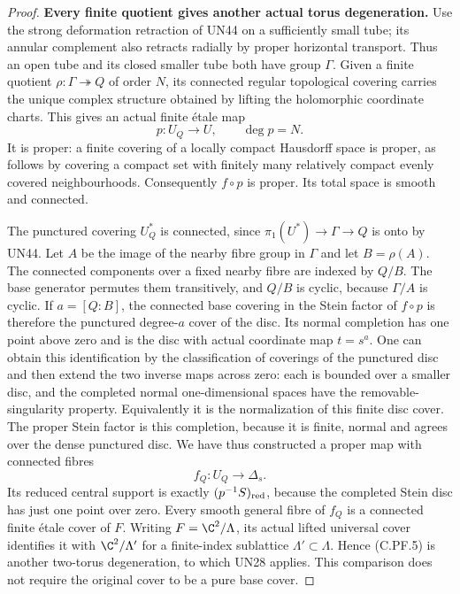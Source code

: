 \begin{proof}
\par\medskip\noindent\textbf{Every finite quotient gives another actual torus degeneration.}
Use the strong deformation retraction of UN44 on a sufficiently
small tube; its annular complement also retracts radially by proper
horizontal transport. Thus an open tube and its closed smaller
tube both have group $\Gamma$. Given a finite quotient
$\rho:\Gamma\twoheadrightarrow Q$ of order $N$, its connected
regular topological covering carries the unique complex structure
obtained by lifting the holomorphic coordinate charts. This gives
an actual finite \'{e}tale map
\[
                     p:U_Q\longrightarrow U,\qquad \deg p=N.
                                                        \tag{C.PF.4}
\]
It is proper: a finite covering of a locally compact Hausdorff
space is proper, as follows by covering a compact set with
finitely many relatively compact evenly covered neighbourhoods.
Consequently $f\circ p$ is proper. Its total space is smooth and
connected.

The punctured covering $U_Q^*$ is connected, since
$\pi_1(U^*)\to\Gamma\to Q$ is onto by UN44. Let $A$ be the image
of the nearby fibre group in $\Gamma$ and let $B=\rho(A)$.
The connected components over a fixed nearby fibre are indexed
by $Q/B$. The base generator permutes them transitively, and
$Q/B$ is cyclic, because $\Gamma/A$ is cyclic. If
$a=[Q:B]$, the connected base covering in the Stein factor of
$f\circ p$ is therefore the punctured degree-$a$ cover of the disc.
Its normal completion has one point above zero and is the disc
with actual coordinate map $t=s^a$. One can obtain this
identification by the classification of coverings of the
punctured disc and then extend the two inverse maps across zero:
each is bounded over a smaller disc, and the completed normal
one-dimensional spaces have the removable-singularity property.
Equivalently it is the normalization of this finite disc cover.
The proper Stein factor is this completion, because it is finite,
normal and agrees over the dense punctured disc. We have thus
constructed a proper map with connected fibres
\[
                        f_Q:U_Q\longrightarrow\Delta_s .
                                                        \tag{C.PF.5}
\]
Its reduced central support is exactly $(p^{-1}S)_{\rm red}$,
because the completed Stein disc has just one point over zero.
Every smooth general fibre of $f_Q$ is a connected finite \'{e}tale
cover of $F$. Writing $F=\C^2/\Lambda$, its actual lifted universal
cover identifies it with $\C^2/\Lambda'$ for a finite-index
sublattice $\Lambda'\subset\Lambda$. Hence (C.PF.5) is another
two-torus degeneration, to which UN28 applies. This comparison
does not require the original cover to be a pure base cover.


\end{proof}
